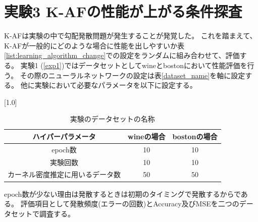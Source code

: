 \section{実験3 K-AFの性能が上がる条件探査}
\label{exp3}
K-AFは実験の中で勾配発散問題が発生することが発覚した。
これを踏まえて、K-AFが一般的にどのような場合に性能を出しやすいか表\ref{list:learning_algorithm_change}での設定をランダムに組み合わせて、評価する。
実験1 (\ref{exp1})ではデータセットとしてwineとbostonにおいて性能評価を行う。
その際のニューラルネットワークの設定は表\ref{dataset_name}を軸に設定する。
他に実験において必要なパラメータを以下に設定する。


\begin{table}[hbtp]
    \begin{center}
        \caption{実験のデータセットの名称}
        \vspace{2mm} 
        \scalebox{1.0}[1.0]{
            \begin{tabular}{||c|c|c||}
            ハイパーパラメータ  & wineの場合 & bostonの場合 \\
            \hline
            epoch数                           & 10       & 10  \\
            実験回数                           & 10     & 10 \\
            カーネル密度推定に用いるデータ数        & 50           & 50  \\
            \end{tabular}
        }
    \end{center}
\end{table}

epoch数が少ない理由は発散するときは初期のタイミングで発散するからである。
評価項目として発散頻度(エラーの回数)とAccuracy及びMSEを二つのデータセットで調査する。









